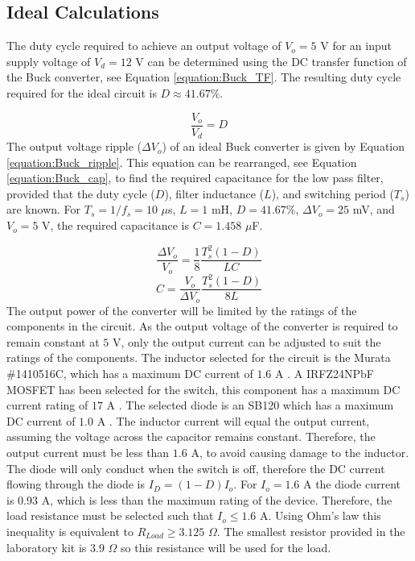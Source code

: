 \documentclass[12pt,twoside]{scrartcl}
\begin{document}
\subsection{Ideal Calculations}
The duty cycle required to achieve an output voltage of $V_{o} = 5$ V for an input supply voltage of $V_{d} = 12$ V can be determined using the DC transfer function of the Buck converter, see Equation \ref{equation:Buck_TF}. The resulting duty cycle required for the ideal circuit is $D \approx 41.67$\%.\par
\begin{equation}
\frac{V_o}{V_d} = D \label{equation:Buck_TF}
\end{equation}
The output voltage ripple ($\Delta V_o$) of an ideal Buck converter is given by Equation \ref{equation:Buck_ripple}. This equation can be rearranged, see Equation \ref{equation:Buck_cap}, to find the required capacitance for the low pass filter, provided that the duty cycle ($D$), filter inductance ($L$), and switching period ($T_{s}$) are known. For $T_{s} = 1/f_{s} = 10$ $\mu$s, $L = 1$ mH, $D = 41.67$\%, $\Delta V_{o} = 25$ mV, and $V_o = 5$ V, the required capacitance is $C = 1.458$ $\mu$F. \par
\begin{equation}
\frac{\Delta V_{o}}{V_{o}} = \frac{1}{8}\frac{T_{s}^{2}(1-D)}{LC} \label{equation:Buck_ripple}
\end{equation}
\begin{equation}
C = \frac{V_o}{\Delta V_{o}}\frac{T_{s}^{2}(1-D)}{8L} \label{equation:Buck_cap}
\end{equation}
The output power of the converter will be limited by the ratings of the components in the circuit. As the output voltage of the converter is required to remain constant at $5$ V, only the output current can be adjusted to suit the ratings of the components. The inductor selected for the circuit is the Murata \#1410516C, which has a maximum DC current of $1.6$ A \cite{RNX0}. A IRFZ24NPbF MOSFET has been selected for the switch, this component has a maximum DC current rating of $17$ A \cite{RNX1}. The selected diode is an SB120 which has a maximum DC current of $1.0$ A \cite{RNX2}. The inductor current will equal the output current, assuming the voltage across the capacitor remains constant. Therefore, the output current must be less than $1.6$ A, to avoid causing damage to the inductor. The diode will only conduct when the switch is off, therefore the DC current flowing through the diode is $I_{D} = (1-D)I_{o}$. For $I_{o} = 1.6$ A the diode current is $0.93$ A, which is less than the maximum rating of the device. Therefore, the load resistance must be selected such that $I_{o} \le 1.6$ A. Using Ohm’s law this inequality is equivalent to $R_{Load} \ge 3.125$ $\Omega$. The smallest resistor provided in the laboratory kit is $3.9$ $\Omega$ so this resistance will be used for the load.\par
\end{document}
